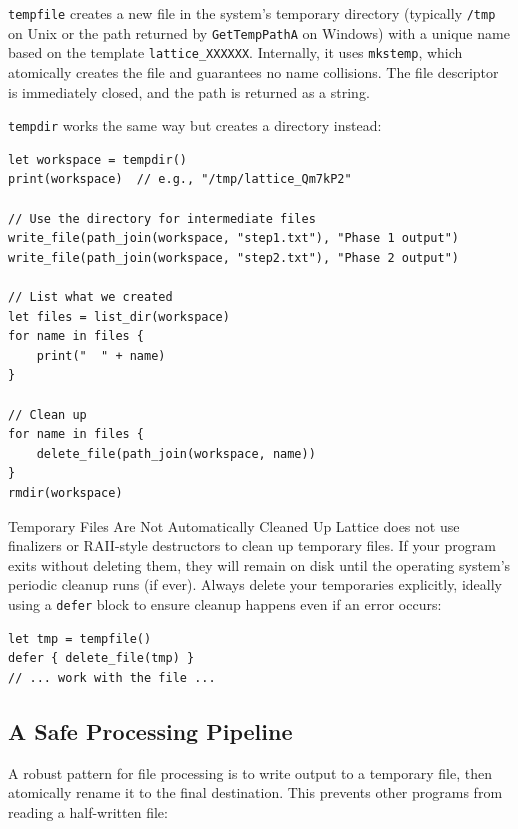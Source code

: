 \lstinline|tempfile| creates a new file in the system's temporary directory
(typically \texttt{/tmp} on Unix or the path returned by
\texttt{GetTempPathA} on Windows) with a unique name based on the template
\texttt{lattice\_XXXXXX}. Internally, it uses \texttt{mkstemp}, which
atomically creates the file and guarantees no name collisions. The file
descriptor is immediately closed, and the path is returned as a string.

\lstinline|tempdir| works the same way but creates a directory instead:

\begin{lstlisting}[language=Lattice, caption={Using a temporary directory as a workspace}]
let workspace = tempdir()
print(workspace)  // e.g., "/tmp/lattice_Qm7kP2"

// Use the directory for intermediate files
write_file(path_join(workspace, "step1.txt"), "Phase 1 output")
write_file(path_join(workspace, "step2.txt"), "Phase 2 output")

// List what we created
let files = list_dir(workspace)
for name in files {
    print("  " + name)
}

// Clean up
for name in files {
    delete_file(path_join(workspace, name))
}
rmdir(workspace)
\end{lstlisting}

\begin{warnbox}{Temporary Files Are Not Automatically Cleaned Up}
Lattice does not use finalizers or RAII-style destructors to clean up
temporary files. If your program exits without deleting them, they will
remain on disk until the operating system's periodic cleanup runs (if ever).
Always delete your temporaries explicitly, ideally using a \lstinline|defer|
block to ensure cleanup happens even if an error occurs:
\begin{lstlisting}[language=Lattice]
let tmp = tempfile()
defer { delete_file(tmp) }
// ... work with the file ...
\end{lstlisting}
\end{warnbox}

\subsection{A Safe Processing Pipeline}\label{sec:safe-pipeline}

A robust pattern for file processing is to write output to a temporary file,
then atomically rename it to the final destination. This prevents other
programs from reading a half-written file:

